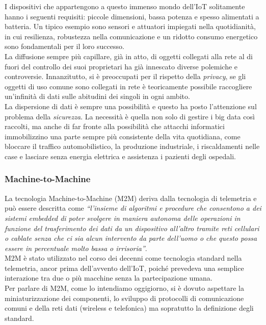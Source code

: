 \noindent I dispositivi che appartengono a questo immenso mondo dell'IoT solitamente hanno i seguenti requisiti: piccole dimensioni, bassa potenza e spesso alimentati a batteria. Un tipico esempio sono sensori e attuatori impiegati nella quotidianità, in cui resilienza, robustezza nella comunicazione e un ridotto consumo energetico sono fondamentali per il loro successo.\\

\noindent La diffusione sempre più capillare, già in atto, di oggetti collegati alla rete al di fuori del controllo dei suoi proprietari ha già innescato diverse polemiche e controversie. 
Innanzitutto, si è preoccupati per il rispetto della \textit{privacy}, se gli oggetti di uso comune sono collegati in rete è teoricamente possibile raccogliere un'infinità di dati sulle abitudini dei singoli in ogni ambito.\\
La dispersione di dati è sempre una possibilità e questo ha posto l'attenzione sul problema della \textit{sicurezza}. 
La necessità è quella non solo di gestire i big data così raccolti, ma anche di far fronte alla possibilità che attacchi informatici immobilizzino una parte sempre più consistente della vita quotidiana, come bloccare il traffico automobilistico, la produzione industriale, i riscaldamenti nelle case e lasciare senza energia elettrica e assistenza i pazienti degli ospedali.

\subsubsection{Machine-to-Machine}
La tecnologia Machine-to-Machine (M2M) deriva dalla tecnologia di telemetria e può essere descritta come \textit{``l'insieme di algoritmi e procedure che consentono a dei sistemi embedded di poter svolgere in maniera autonoma delle operazioni in funzione del trasferimento dei dati da un dispositivo all'altro tramite reti cellulari o cablate senza che ci sia alcun intervento da parte dell'uomo o che questo possa essere in percentuale molto bassa o irrisoria''}.\\
M2M è stato utilizzato nel corso dei decenni come tecnologia standard nella telemetria, ancor prima dell'avvento dell'IoT, poiché prevedeva una semplice interazione tra due o più macchine senza la partecipazione umana.\\
Per parlare di M2M, come lo intendiamo oggigiorno, si è dovuto aspettare la miniaturizzazione dei componenti, lo sviluppo di protocolli di comunicazione comuni e della reti dati (wireless e telefonica) ma sopratutto la definizione degli standard.\\

